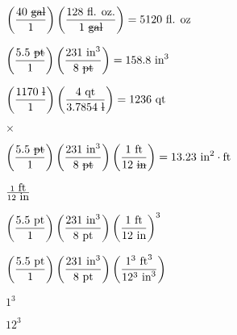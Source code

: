 \documentclass[12pt,a4paper,margin=2cm]{book}
\def\lthtmlcheckvsize{\ifdim\ht\sizebox<\vsize 
  \ifdim\wd\sizebox<\hsize\expandafter\hfill\fi \expandafter\vfill
  \else\expandafter\vss\fi}%
\begin{document}
{\newpage\clearpage
{}%
$\displaystyle \left({40 \hbox{ \sout{gal}} \over 1}\right) \left({128 \hbox{ fl. oz.} \over 1 \hbox{ \sout{gal}}}\right) = 5120 \hbox{ fl. oz}$%
\lthtmlindisplaymathZ
\lthtmlcheckvsize\clearpage}

{\newpage\clearpage
{}%
$\displaystyle \left({5.5 \hbox{ \sout{pt}} \over 1}\right) \left({231 \hbox{ in}^3 \over 8 \hbox{ \sout{pt}}}\right) = 158.8 \hbox{ in}^3$%
\lthtmlindisplaymathZ
\lthtmlcheckvsize\clearpage}

{\newpage\clearpage
{}%
$\displaystyle \left({1170 \hbox{ \sout{l}} \over 1}\right) \left({4 \hbox{ qt} \over 3.7854 \hbox{ \sout{l}}}\right) = 1236 \hbox{ qt}$%
\lthtmlindisplaymathZ
\lthtmlcheckvsize\clearpage}

{\newpage\clearpage
{}%
$ \times$%
\lthtmlindisplaymathZ
\lthtmlcheckvsize\clearpage}

{\newpage\clearpage
{}%
$\displaystyle \left({5.5 \hbox{ \sout{pt}} \over 1}\right) \left({231 \hbox{ in}^3 \over 8 \hbox{ \sout{pt}}}\right) \left(1 \hbox{ ft} \over 12 \hbox{ \sout{in}}\right) = 13.23 \hbox{ in}^2 \cdot \hbox{ft}$%
\lthtmlindisplaymathZ
\lthtmlcheckvsize\clearpage}

{\newpage\clearpage
{}%
$ {1 \hbox{ ft} \over 12 \hbox{ in}}$%
\lthtmlindisplaymathZ
\lthtmlcheckvsize\clearpage}

{\newpage\clearpage
{}%
$\displaystyle \left({5.5 \hbox{ pt} \over 1}\right) \left({231 \hbox{ in}^3 \over 8 \hbox{ pt}}\right) \left(1 \hbox{ ft} \over 12 \hbox{ in}\right)^3$%
\lthtmlindisplaymathZ
\lthtmlcheckvsize\clearpage}

{\newpage\clearpage
{}%
$\displaystyle \left({5.5 \hbox{ pt} \over 1}\right) \left({231 \hbox{ in}^3 \over 8 \hbox{ pt}}\right) \left(1^3 \hbox{ ft}^3 \over 12^3 \hbox{ in}^3\right)$%
\lthtmlindisplaymathZ
\lthtmlcheckvsize\clearpage}

{\newpage\clearpage
{}%
$ 1^3$%
\lthtmlindisplaymathZ
\lthtmlcheckvsize\clearpage}

{\newpage\clearpage
{}%
$ 12^3$%
\lthtmlindisplaymathZ
\lthtmlcheckvsize\clearpage}
\end{document}
